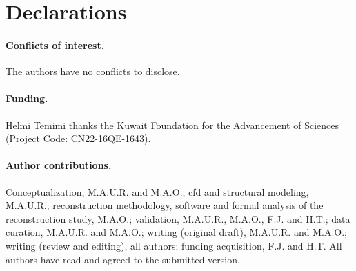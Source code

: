\documentclass[12pt,a4paper]{article}
\newcommand{\CFD}{\ac{cfd}\xspace}
\theoremstyle{definition}
\numberwithin{equation}{section}
\newif\ifanonymized
\begin{document}
\section*{Declarations}
\paragraph{Conflicts of interest.} The authors have no conflicts to disclose.

\ifanonymized
\paragraph{Funding and author contributions.} Removed for anonymized review.
\else
\paragraph{Funding.} Helmi Temimi thanks the Kuwait Foundation for the Advancement of Sciences (Project Code: CN22-16QE-1643).

\paragraph{Author contributions.} Conceptualization, M.A.U.R. and M.A.O.; \CFD and structural modeling, M.A.U.R.; reconstruction methodology, software and formal analysis of the reconstruction study, M.A.O.; validation, M.A.U.R., M.A.O., F.J. and H.T.; data curation, M.A.U.R. and M.A.O.; writing (original draft), M.A.U.R. and M.A.O.; writing (review and editing), all authors; funding acquisition, F.J. and H.T. All authors have read and agreed to the submitted version.
\fi



\ifanonymized \paragraph{Data availability statement.} The \CFD exports analyzed in this study are available from the corresponding author on reasonable request.  The reconstruction code and configuration files are available in a public repository whose link is withheld for anonymized review. The reconstruction code and configuration files are available at \url{https://github.com/michaelajao/IdealAorta-PINN}.\else \fi
\end{document}
